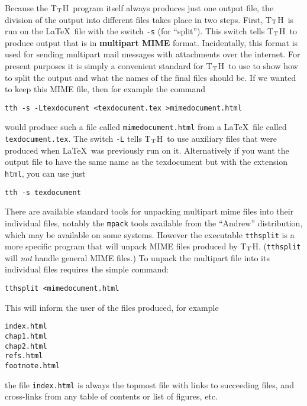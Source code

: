 \documentclass[12pt]{article}
\def\tth{T$_{\rm T}$H}
\begin{document}
Because the \tth\ program itself always produces just one output file,
the division of the output into different files takes place in two
steps. First, \tth\ is run on the \LaTeX\ file with the switch
\verb!-s! (for ``split''). This switch tells \tth\ to produce output
that is in {\bf multipart MIME} format. Incidentally, this format is
used for sending multipart mail messages with attachments over the
internet. For present purposes it is simply a convenient standard for
\tth\ to use to show how to split the output and what the names of the
final files should be. If we wanted to keep this MIME file, then for
example the command
\begin{verbatim}
tth -s -Ltexdocument <texdocument.tex >mimedocument.html
\end{verbatim}

\noindent would produce such a file called \verb!mimedocument.html! from a
\LaTeX\ file called \verb!texdocument.tex!. The switch \verb!-L!
tells \tth\ to use auxiliary files that were produced when \LaTeX\ 
was previously run on it. Alternatively if you want the output file to
have the same name as the texdocument but with the extension
\verb!html!, you can use just
\begin{verbatim}
tth -s texdocument
\end{verbatim}

There are available standard tools for unpacking multipart mime files
into their individual files, notably the \verb!mpack! tools available from
the ``Andrew'' distribution, which may be available on some
systems. However the executable \verb!tthsplit! is a more specific 
program that will unpack MIME files produced by \tth. (\verb!tthsplit!
will {\em not} handle general MIME files.) To unpack the multipart
file into its individual files requires the simple command:

\begin{verbatim}
tthsplit <mimedocument.html
\end{verbatim}

\noindent This will inform the user of the files produced, for
example

\begin{verbatim}
index.html
chap1.html
chap2.html
refs.html
footnote.html
\end{verbatim}

\noindent the file \verb!index.html! is always the topmost file with
links to succeeding files, and cross-links from any table of contents
or list of figures, etc. 
\end{document}
